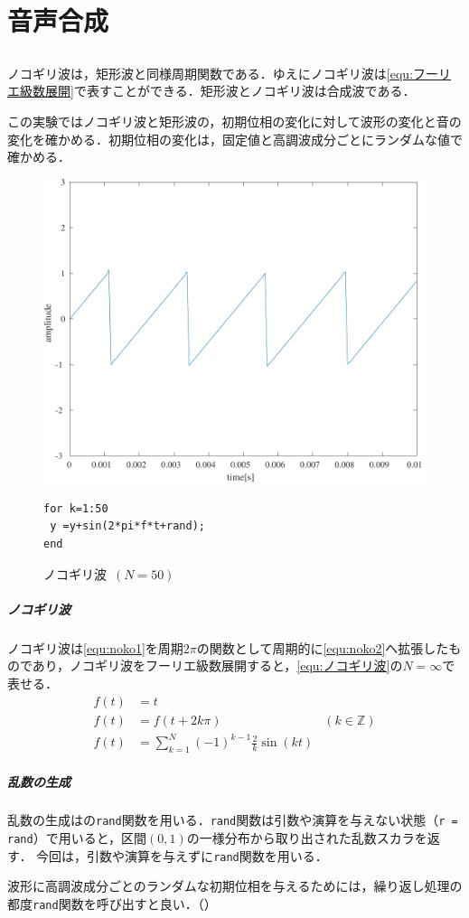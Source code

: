 \chapter{音声合成}
\section{\kadaica}\label{sec:\kadaica}
\purpose
ノコギリ波は，矩形波と同様周期関数である．ゆえにノコギリ波は\eqref{equ:フーリエ級数展開}で表すことができる．矩形波とノコギリ波は合成波である．\par
この実験ではノコギリ波と矩形波の，初期位相の変化に対して波形の変化と音の変化を確かめる．初期位相の変化は，固定値と高調波成分ごとにランダムな値で確かめる．

\begin{figure}
    \centering
    \includegraphics[keepaspectratio,width=.3\textwidth]{../../Figures/03_11_nokogiri.pdf}
    \caption{ノコギリ波\ \((N=50)\)}
    \label{fig:ノコギリ波}
    \begin{lstlisting}[caption={ランダム初期位相},label={src:ランダム初期位相},numbers={none}]
for k=1:50
 y =y+sin(2*pi*f*t+rand);
end    
    \end{lstlisting}
    \vspace{-2cm}
\end{figure}
\method
\paragraph{ノコギリ波}ノコギリ波は\eqref{equ:noko1}を周期\(2\pi\)の関数として周期的に\eqref{equ:noko2}へ拡張したものであり，ノコギリ波をフーリエ級数展開すると，\eqref{equ:ノコギリ波}の\(N=\infty\)で表せる．
\begin{align}
    f(t) & =t\label{equ:noko1}                                                                               \\
    f(t) & =f(t+2k\pi)                                                   & (k\in\mathbb{Z})\label{equ:noko2} \\
    f(t) & =\sum_{k=1}^{N}(-1)^{k-1}\frac{2}{k}\sin(kt)\label{equ:ノコギリ波}
\end{align}
\paragraph{乱数の生成}乱数の生成は\matlab の\texttt{rand}関数を用いる．\texttt{rand}関数は引数や演算を与えない状態（\texttt{r = rand}）で用いると，区間\((0,1)\)の一様分布から取り出された乱数スカラを返す\cite{matlab_rand}．
今回は，引数や演算を与えずに\texttt{rand}関数を用いる．\par
波形に高調波成分ごとのランダムな初期位相を与えるためには，繰り返し処理の都度\texttt{rand}関数を呼び出すと良い．（）
